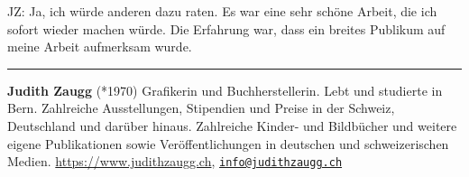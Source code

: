 \documentclass[a4paper,
fontsize=11pt,
oneside,
numbers=noperiodatend,
parskip=half-,
bibliography=totoc,
final
]{scrartcl}
\begin{document}
JZ: Ja, ich würde anderen dazu raten. Es war eine sehr schöne Arbeit,
die ich sofort wieder machen würde. Die Erfahrung war, dass ein breites
Publikum auf meine Arbeit aufmerksam wurde.

\begin{center}\rule{0.5\linewidth}{0.5pt}\end{center}

\textbf{Judith Zaugg} (*1970) Grafikerin und Buchherstellerin. Lebt und
studierte in Bern. Zahlreiche Ausstellungen, Stipendien und Preise in
der Schweiz, Deutschland und darüber hinaus. Zahlreiche Kinder- und
Bildbücher und weitere eigene Publikationen sowie Veröffentlichungen in
deutschen und schweizerischen Medien. \url{https://www.judithzaugg.ch},
\href{mailto:info@judithzaugg.ch}{\nolinkurl{info@judithzaugg.ch}}
\end{document}
